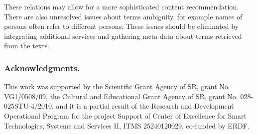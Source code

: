 \documentclass{llncs}%
\begin{document}
These relations may allow for a more sophisticated content recommendation. There are also unresolved issues about terms ambiguity, for example names of persons often refer to different persons. These issues should be eliminated by integrating additional services and gathering meta-data about terms retrieved from the texts. 

\subsubsection{Acknowledgments.} This work was supported by the Scientific Grant Agency of SR, grant No. VG1/0508/09, the Cultural and Educational Grant Agency of SR, grant No. 028-025STU-4/2010, and it is a partial result of the Research and Development Operational Program for the project Support of Center of Excellence for Smart Technologies, Systems and Services II, ITMS 25240120029, co-funded by ERDF. 

\end{document}
